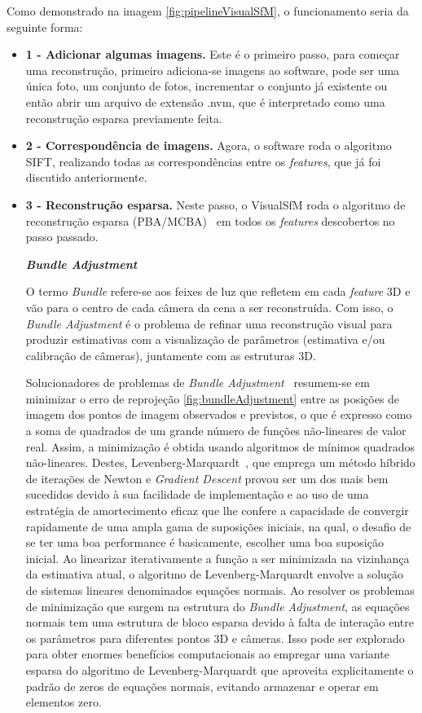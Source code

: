 Como demonstrado na imagem \ref{fig:pipelineVisualSfM}, o funcionamento seria da seguinte forma:

\begin{itemize}
\item \textbf{1 - Adicionar algumas imagens.} Este é o primeiro passo, para começar uma reconstrução, primeiro adiciona-se imagens ao software, pode ser uma única foto, um conjunto de fotos, incrementar o conjunto já existente ou então abrir um arquivo de extensão .nvm, que é interpretado como uma reconstrução esparsa previamente feita.

\item \textbf{2 - Correspondência de imagens.} Agora, o software roda o algoritmo SIFT, realizando todas as correspondências entre os \emph{features}, que já foi discutido anteriormente.

\item \textbf{3 - Reconstrução esparsa.} Neste passo, o VisualSfM roda o algoritmo de reconstrução esparsa (PBA/MCBA)~\cite{wu2011multicore} em todos os \emph{features} descobertos no passo passado. 

\textbf{\emph{Bundle Adjustment}}

O termo \emph{Bundle} refere-se aos feixes de luz que refletem em cada \emph{feature} 3D e vão para o centro de cada câmera da cena a ser reconstruída. Com isso, o \emph{Bundle Adjustment} é o problema de refinar uma reconstrução visual para produzir estimativas com a visualização de parâmetros (estimativa e/ou calibração de câmeras), juntamente com as estruturas 3D.

Solucionadores de problemas de \emph{Bundle Adjustment}~\cite{bundleAdjustmentSlide} resumem-se em minimizar o erro de reprojeção \ref{fig:bundleAdjustment} entre as posições de imagem dos pontos de imagem observados e previstos, o que é expresso como a soma de quadrados de um grande número de funções não-lineares de valor real. Assim, a minimização é obtida usando algoritmos de mínimos quadrados não-lineares. Destes, Levenberg-Marquardt~\cite{more1978levenberg,press1992art}, que emprega um método híbrido de iterações de Newton e \emph{Gradient Descent} provou ser um dos mais bem sucedidos devido à sua facilidade de implementação e ao uso de uma estratégia de amortecimento eficaz que lhe confere a capacidade de convergir rapidamente de uma ampla gama de suposições iniciais, na qual, o desafio de se ter uma boa performance é basicamente, escolher uma boa suposição inicial. Ao linearizar iterativamente a função a ser minimizada na vizinhança da estimativa atual, o algoritmo de Levenberg-Marquardt envolve a solução de sistemas lineares denominados equações normais. Ao resolver os problemas de minimização que surgem na estrutura do \emph{Bundle Adjustment}, as equações normais tem uma estrutura de bloco esparsa devido à falta de interação entre os parâmetros para diferentes pontos 3D e câmeras. Isso pode ser explorado para obter enormes benefícios computacionais ao empregar uma variante esparsa do algoritmo de Levenberg-Marquardt que aproveita explicitamente o padrão de zeros de equações normais, evitando armazenar e operar em elementos zero. 


\end{itemize}
